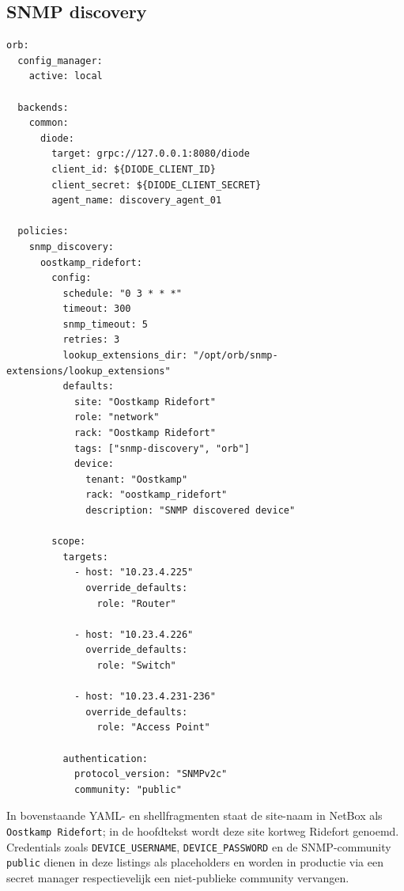 \subsection{SNMP discovery}

\begin{listing}[H]
  \caption[Orb agent voor SNMP discovery]{Volledige Orb-agentconfiguratie voor SNMP discovery (\S\ref{sec:architectuur})}
  \label{lst:orb-snmp-discovery-config}
  \begin{verbatim}
orb:
  config_manager:
    active: local

  backends:
    common:
      diode:
        target: grpc://127.0.0.1:8080/diode
        client_id: ${DIODE_CLIENT_ID}
        client_secret: ${DIODE_CLIENT_SECRET}
        agent_name: discovery_agent_01

  policies:
    snmp_discovery:
      oostkamp_ridefort:
        config:
          schedule: "0 3 * * *"
          timeout: 300
          snmp_timeout: 5
          retries: 3
          lookup_extensions_dir: "/opt/orb/snmp-extensions/lookup_extensions"
          defaults:
            site: "Oostkamp Ridefort"
            role: "network"
            rack: "Oostkamp Ridefort"
            tags: ["snmp-discovery", "orb"]
            device:
              tenant: "Oostkamp"
              rack: "oostkamp_ridefort"
              description: "SNMP discovered device"

        scope:
          targets:
            - host: "10.23.4.225"
              override_defaults:
                role: "Router"

            - host: "10.23.4.226"
              override_defaults:
                role: "Switch"

            - host: "10.23.4.231-236"
              override_defaults:
                role: "Access Point"

          authentication:
            protocol_version: "SNMPv2c"
            community: "public"
  \end{verbatim}
\end{listing}

In bovenstaande YAML- en shellfragmenten staat de site-naam in NetBox als \texttt{Oostkamp Ridefort}; in de hoofdtekst wordt deze site kortweg Ridefort genoemd. Credentials zoals \texttt{DEVICE\_USERNAME}, \texttt{DEVICE\_PASSWORD} en de SNMP-community \texttt{public} dienen in deze listings als placeholders en worden in productie via een secret manager respectievelijk een niet-publieke community vervangen.

